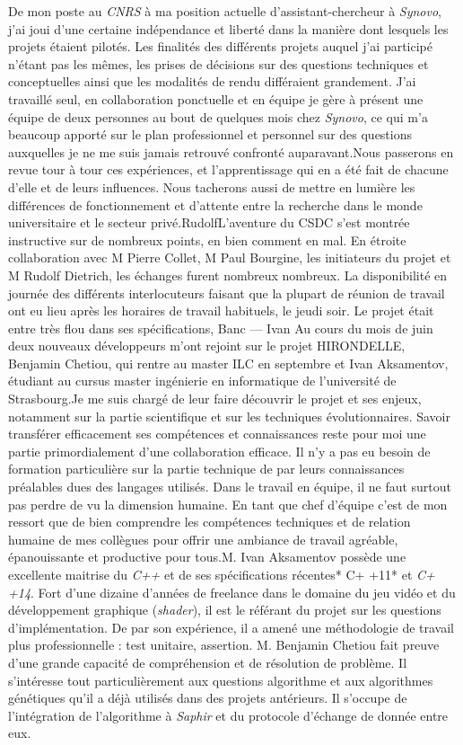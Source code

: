 \documentclass[french, 11pt]{memoir}
\begin{document}
De mon poste au \emph{CNRS} à ma position actuelle d'assistant-chercheur
à \emph{Synovo}, j'ai joui d'une certaine indépendance et liberté dans
la manière dont lesquels les projets étaient pilotés. Les finalités des
différents projets auquel j'ai participé n'étant pas les mêmes, les
prises de décisions sur des questions techniques et conceptuelles ainsi
que les modalités de rendu différaient grandement. J'ai travaillé seul,
en collaboration ponctuelle et en équipe je gère à présent une équipe de
deux personnes au bout de quelques mois chez \emph{Synovo}, ce qui m'a
beaucoup apporté sur le plan professionnel et personnel sur des
questions auxquelles je ne me suis jamais retrouvé confronté
auparavant.Nous passerons en revue tour à tour ces expériences, et
l'apprentissage qui en a été fait de chacune d'elle et de leurs
influences. Nous tacherons aussi de mettre en lumière les différences de
fonctionnement et d'attente entre la recherche dans le monde
universitaire et le secteur privé.RudolfL'aventure du CSDC s'est montrée
instructive sur de nombreux points, en bien comment en mal. En étroite
collaboration avec M Pierre Collet, M Paul Bourgine, les initiateurs du
projet et M Rudolf Dietrich, les échanges furent nombreux nombreux. La
disponibilité en journée des différents interlocuteurs faisant que la
plupart de réunion de travail ont eu lieu après les horaires de travail
habituels, le jeudi soir. Le projet était entre très flou dans ses
spécifications, Banc --- Ivan Au cours du mois de juin deux nouveaux
développeurs m'ont rejoint sur le projet HIRONDELLE, Benjamin Chetiou,
qui rentre au master ILC en septembre et Ivan Aksamentov, étudiant au
cursus master ingénierie en informatique de l'université de
Strasbourg.Je me suis chargé de leur faire découvrir le projet et ses
enjeux, notamment sur la partie scientifique et sur les techniques
évolutionnaires. Savoir transférer efficacement ses compétences et
connaissances reste pour moi une partie primordialement d'une
collaboration efficace. Il n'y a pas eu besoin de formation particulière
sur la partie technique de par leurs connaissances préalables dues des
langages utilisés. Dans le travail en équipe, il ne faut surtout pas
perdre de vu la dimension humaine. En tant que chef d'équipe c'est de
mon ressort que de bien comprendre les compétences techniques et de
relation humaine de mes collègues pour offrir une ambiance de travail
agréable, épanouissante et productive pour tous.M. Ivan Aksamentov
possède une excellente maitrise du \emph{C++} et de ses spécifications
récentes* C+ +11* et \emph{C+ +14}. Fort d'une dizaine d'années de
freelance dans le domaine du jeu vidéo et du développement graphique
(\emph{shader}), il est le référant du projet sur les questions
d'implémentation. De par son expérience, il a amené une méthodologie de
travail plus professionnelle : test unitaire, assertion. M. Benjamin
Chetiou fait preuve d'une grande capacité de compréhension et de
résolution de problème. Il s'intéresse tout particulièrement aux
questions algorithme et aux algorithmes génétiques qu'il a déjà utilisés
dans des projets antérieurs. Il s'occupe de l'intégration de
l'algorithme à \emph{Saphir} et du protocole d'échange de donnée entre
eux.
\end{document}
